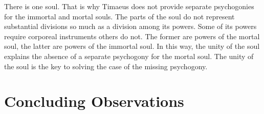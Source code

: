 There is one soul. That is why Timaeus does not provide separate psychogonies for the immortal and mortal souls. The parts of the soul do not represent substantial divisions so much as a division among its powers. Some of its powers require corporeal instruments others do not. The former are powers of the mortal soul, the latter are powers of the immortal soul. In this way, the unity of the soul explains the absence of a separate psychogony for the mortal soul. The unity of the soul is the key to solving the case of the missing psychogony.


\section{Concluding Observations} %
\label{sec:concluding_observations}




